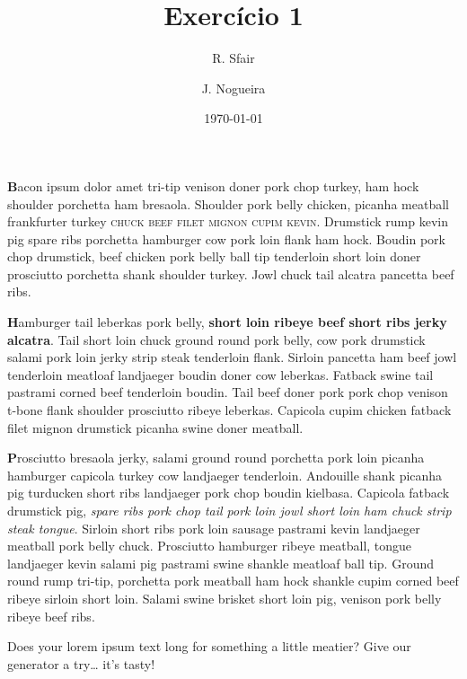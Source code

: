 \documentclass[a4paper,11pt]{article}
\title{Exercício 1}
\author{R. Sfair \and J. Nogueira}
\date{\today}
\begin{document}
\maketitle

\textbf{\Large{B}}acon ipsum dolor amet tri-tip venison doner pork chop turkey, ham hock shoulder porchetta ham bresaola. Shoulder pork belly chicken, picanha meatball frankfurter turkey \textsc{chuck beef filet mignon cupim kevin}. Drumstick rump kevin pig spare ribs porchetta hamburger cow pork loin flank ham hock. Boudin pork chop drumstick, beef chicken pork belly ball tip tenderloin short loin doner prosciutto porchetta shank shoulder turkey. Jowl chuck tail alcatra pancetta beef ribs.

\textbf{\Large{H}}amburger tail leberkas pork belly, \textbf{short loin ribeye beef short ribs jerky alcatra}. Tail short loin chuck ground round pork belly, cow pork drumstick salami pork loin jerky strip steak tenderloin flank. Sirloin pancetta ham beef jowl tenderloin meatloaf landjaeger boudin doner cow leberkas. Fatback swine tail pastrami corned beef tenderloin boudin. Tail beef doner pork pork chop venison t-bone flank shoulder prosciutto ribeye leberkas. Capicola cupim chicken fatback filet mignon drumstick picanha swine doner meatball.

\textbf{\Large{P}}rosciutto bresaola jerky, salami ground round porchetta pork loin picanha hamburger capicola turkey cow landjaeger tenderloin. Andouille shank picanha pig turducken short ribs landjaeger pork chop boudin kielbasa. Capicola fatback drumstick pig, \textit{spare ribs pork chop tail pork loin jowl short loin ham chuck strip steak tongue}. Sirloin short ribs pork loin sausage pastrami kevin landjaeger meatball pork belly chuck. Prosciutto hamburger ribeye meatball, tongue landjaeger kevin salami pig pastrami swine shankle meatloaf ball tip. Ground round rump tri-tip, porchetta pork meatball ham hock shankle cupim corned beef ribeye sirloin short loin. Salami swine brisket short loin pig, venison pork belly ribeye beef ribs.

Does your lorem ipsum text long for something a little meatier? Give our generator a try… it’s tasty!
\end{document}
